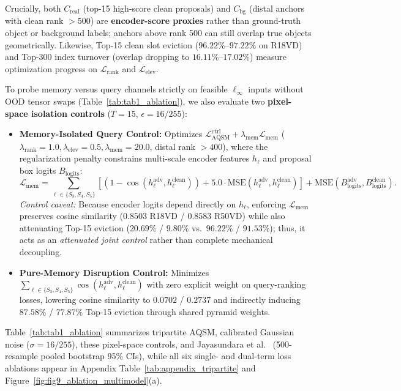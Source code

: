 \documentclass[preprint,10pt]{elsarticle}
\begin{document}
Crucially, both $C_{\mathrm{real}}$ (top-15 high-score clean proposals) and $C_{\mathrm{bg}}$ (distal anchors with clean rank $> 500$) are \textbf{encoder-score proxies} rather than ground-truth object or background labels; anchors above rank 500 can still overlap true objects geometrically. Likewise, Top-15 clean slot eviction ($96.22\%$--$97.22\%$ on R18VD) and Top-300 index turnover (overlap dropping to $16.11\%$--$17.02\%$) measure optimization progress on $\mathcal{L}_{\mathrm{rank}}$ and $\mathcal{L}_{\mathrm{elev}}$.

To probe memory versus query channels strictly on feasible $\ell_\infty$ inputs without OOD tensor swaps (Table~\ref{tab:tab1_ablation}), we also evaluate two \textbf{pixel-space isolation controls} ($T = 15$, $\epsilon = 16/255$):
\begin{itemize}
    \item \textbf{Memory-Isolated Query Control:} Optimizes $\mathcal{L}_{\mathrm{AQSM}}^{\mathrm{ctrl}} + \lambda_{\mathrm{mem}} \mathcal{L}_{\mathrm{mem}}$ ($\lambda_{\mathrm{rank}}=1.0, \lambda_{\mathrm{elev}}=0.5, \lambda_{\mathrm{mem}}=20.0$, distal rank $> 400$), where the regularization penalty constrains multi-scale encoder features $h_\ell$ and proposal box logits $B_{\mathrm{logits}}$:
    \begin{equation}
    \mathcal{L}_{\mathrm{mem}} = \sum_{\ell \in \{S_3, S_4, S_5\}} \left[ \left(1 - \cos(h_\ell^{\mathrm{adv}}, h_\ell^{\mathrm{clean}})\right) + 5.0 \cdot \mathrm{MSE}(h_\ell^{\mathrm{adv}}, h_\ell^{\mathrm{clean}}) \right] + \mathrm{MSE}(B_{\mathrm{logits}}^{\mathrm{adv}}, B_{\mathrm{logits}}^{\mathrm{clean}}).
    \end{equation}
    \textit{Control caveat:} Because encoder logits depend directly on $h_\ell$, enforcing $\mathcal{L}_{\mathrm{mem}}$ preserves cosine similarity ($0.8503$ R18VD / $0.8583$ R50VD) while also attenuating Top-15 eviction ($20.69\%$ / $9.80\%$ vs.\ $96.22\%$ / $91.53\%$); thus, it acts as an \textit{attenuated joint control} rather than complete mechanical decoupling.
    \item \textbf{Pure-Memory Disruption Control:} Minimizes $\sum_{\ell \in \{S_3,S_4,S_5\}} \cos(h_\ell^{\mathrm{adv}}, h_\ell^{\mathrm{clean}})$ with zero explicit weight on query-ranking losses, lowering cosine similarity to $0.0702$ / $0.2737$ and indirectly inducing $87.58\%$ / $77.87\%$ Top-15 eviction through shared pyramid weights.
\end{itemize}
Table~\ref{tab:tab1_ablation} summarizes tripartite AQSM, calibrated Gaussian noise ($\sigma = 16/255$), these pixel-space controls, and Jayasundara et al.\ \citep{jayasundara2024attention} (500-resample pooled bootstrap 95\% CIs), while all six single- and dual-term loss ablations appear in Appendix Table~\ref{tab:appendix_tripartite} and Figure~\ref{fig:fig9_ablation_multimodel}(a).
\end{document}
